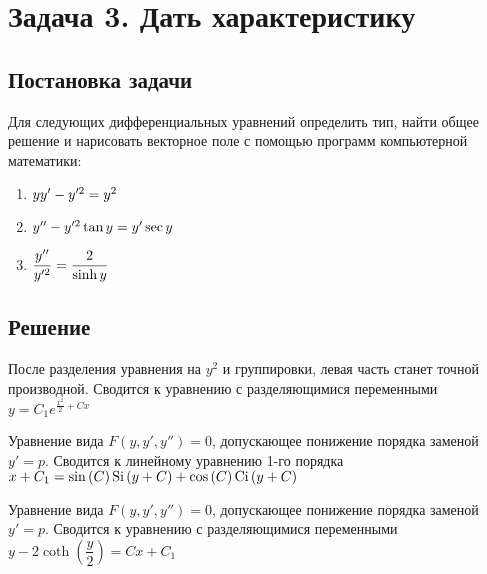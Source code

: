

\section{Задача 3. Дать характеристику}
\subsection{Постановка задачи}
Для следующих дифференциальных уравнений определить тип, найти общее
решение и нарисовать векторное поле с помощью программ компьютерной математики:

\begin{enumerate}
	\item $ yy'-y'^2=y^2 $
	\item $ y''-y'^2\tan{y}=y'\sec{y} $
	\item $ \dfrac{y''}{y'^2}=\dfrac{2}{\sinh{y}} $
\end{enumerate}

\newpage

\subsection{Решение}
\begin{enumerate}
	\solutionItemThird
		{\equationFirst}
		{
			После разделения уравнения на $ y^2 $ и группировки, 
			левая часть станет точной производной.
		}
		{Сводится к уравнению с разделяющимися переменными}
		{$ y = C_1 e^{\frac{x^2}{2} + Cx} $}
	
	\vspace{1.5em}

	\solutionItemThird
		{\equationSecond}
		{
			Уравнение вида $ F(y, y', y'') = 0 $, допускающее 
			понижение порядка заменой $ y' = p $. 
		}
		{Сводится к линейному уравнению 1-го порядка}
		{$ x + C_1 = \sin{(C)} \operatorname{Si}{(y + C)} + \cos{(C)} \operatorname{Ci}{(y + C)} $}
		
	\vspace{1.5em}	
		
	\solutionItemThird
		{\equationThird}
		{ 
			Уравнение вида $ F(y, y', y'') = 0 $, допускающее
			понижение порядка заменой $ y' = p $.
		}
		{Сводится к уравнению с разделяющимися переменными}
		{$ y - 2\coth{(\dfrac{y}{2})} = Cx + C_1 $}
\end{enumerate}
